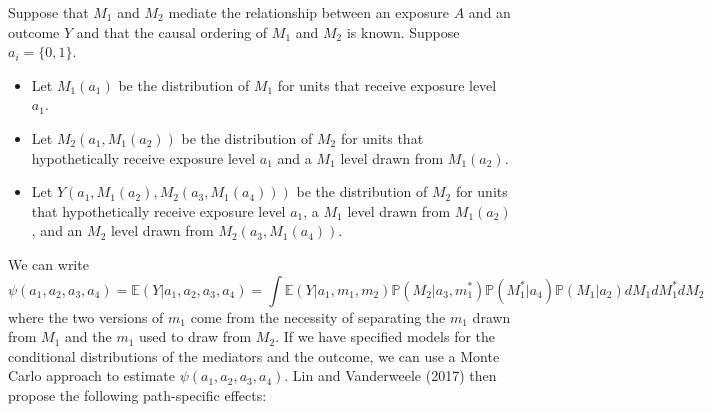 \documentclass[12pt]{article} %
\numberwithin{equation}{section} %
\begin{document}
Suppose that $M_{1}$ and $M_{2}$ mediate the relationship between an exposure $A$ and an outcome $Y$
and that the causal ordering of $M_{1}$ and $M_{2}$ is known. Suppose $a_{i} = \{0, 1\}$. 
\begin{itemize}
\item Let $M_{1}(a_{1})$ be the distribution of $M_{1}$ for units that receive exposure level $a_{1}$. 
\item Let $M_{2}(a_{1},M_{1}(a_{2}))$ be the distribution of $M_{2}$ for units
that hypothetically receive exposure level $a_{1}$ and a $M_{1}$ level drawn from $M_{1}(a_{2})$.
\item Let $Y(a_{1},M_{1}(a_{2}),M_2(a_{3},M_{1}(a_{4})))$ be the distribution of $M_{2}$ for units
that hypothetically receive exposure level $a_{1}$, a $M_{1}$ level drawn from $M_{1}(a_{2})$,
and an $M_{2}$ level drawn from $M_{2}(a_{3},M_{1}(a_{4}))$.
\end{itemize}

We can write 
$$\psi(a_{1},a_{2},a_{3},a_{4}) = \mathbb{E}(Y|a_{1},a_{2},a_{3},a_{4}) = \int \mathbb{E}(Y|a_{1},m_{1},m_{2})\mathbb{P}(M_{2}|a_{3},m_{1}^{*})\mathbb{P}(M_{1}^{*}|a_{4})\mathbb{P}(M_{1}|a_{2})dM_{1}dM_{1}^{*}dM_{2}$$
where the two versions of $m_{1}$ come from the necessity of separating the $m_{1}$ 
drawn from $M_{1}$ and the $m_{1}$ used to draw from $M_{2}$.   
If we have specified models for the conditional distributions of the mediators and
the outcome, we can use a Monte Carlo approach to estimate $\psi(a_{1},a_{2},a_{3},a_{4})$.
Lin and Vanderweele (2017) then propose the following path-specific effects: 
\end{document}
